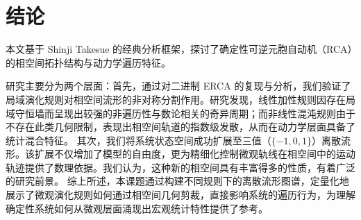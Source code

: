\documentclass[reprint, amsmath, amssymb, aps, physrev,prb]{revtex4-2}
\begin{document}
\FloatBarrier
\section{结论}

本文基于 Shinji Takesue 的经典分析框架，探讨了确定性可逆元胞自动机（RCA）的相空间拓扑结构与动力学遍历特征。

研究主要分为两个层面：首先，通过对二进制 ERCA 的复现与分析，我们验证了局域演化规则对相空间流形的非对称分割作用。研究发现，线性加性规则因存在局域守恒墙而呈现出较强的非遍历性与数论相关的奇异周期；而非线性混沌规则由于不存在此类几何限制，表现出相空间轨道的指数级发散，从而在动力学层面具备了统计混合特征。
其次，我们将系统状态空间成功扩展至三值（$\{-1, 0, 1\}$）离散流形。该扩展不仅增加了模型的自由度，更为精细化控制微观轨线在相空间中的运动轨迹提供了数理依据。我们认为，这种新的相空间具有丰富得多的性质，有着广泛的研究前景。
综上所述，本课题通过构建不同规则下的离散流形图谱，定量化地展示了微观演化规则如何通过相空间几何剪裁，直接影响系统的遍历行为，为理解确定性系统如何从微观层面涌现出宏观统计特性提供了参考。



\appendix
\end{document}
